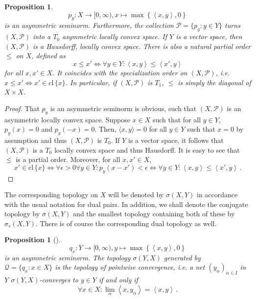 \documentclass[
	paper=A4,
	pagesize=auto,
	fontsize=12pt
]{scrartcl}
\theoremstyle{plain}
\newtheorem{proposition}[theorem]{Proposition}
\theoremstyle{remark}
\theoremstyle{definition}
\begin{document}
\begin{proposition}
\label{prop:WeakTop}
\begin{equation}
p_y : X \to [0, \infty), x \mapsto \max \left\{ \left\langle x, y \right\rangle, 0 \right\}
\end{equation}
%
is an asymmetric seminorm.
Furthermore, the collection $\mathcal{P} = \{ p_y : y \in Y \}$ turns $(X, \mathcal{P})$ into a $T_0$ asymmetric locally convex space.
If $Y$ is a vector space, then $(X, \mathcal{P})$ is a Hausdorff, locally convex space.
There is also a natural partial order $\le$ on $X$, defined as
%
\begin{equation}
x \le x' \iff \forall y \in Y : \left< x, y \right> \le \left< x', y \right>
\end{equation}
%
for all $x, x' \in X$.
It coincides with the specialization order on $(X, \mathcal{P})$, i.e. $x \le x' \iff x' \in \mathrm{cl}\, \{ x \}$.
In particular, if $(X, \mathcal{P})$ is $T_1$, $\le$ is simply the diagonal of $X \times X$.
\end{proposition}
\begin{proof}
That $p_y$ is an asymmetric seminorm is obvious, such that $(X, \mathcal{P})$ is an asymmetric locally convex space.
Suppose $x \in X$ such that for all $y \in Y$, $p_y(x) = 0$ and $p_y(-x) = 0$.
Then, $\langle x, y \rangle = 0$ for all $y \in Y$ such that $x = 0$ by assumption and thus $(X, \mathcal{P})$ is $T_0$.
If $Y$ is a vector space, it follows that $(X, \mathcal{P})$ is a $T_0$ locally convex space and thus Hausdorff.
It is easy to see that $\le$ is a partial order.
Moreover, for all $x, x' \in X$,
%
\begin{equation}
x' \in \mathrm{cl}\, \{ x \}
\iff
\forall \epsilon > 0 \forall y \in Y : p_y \left( x - x' \right) < \epsilon
\iff
\forall y \in Y : \left< x, y \right> \le \left< x', y \right> \, .
\end{equation}
\end{proof}
%
The corresponding topology on $X$ will be denoted by $\sigma(X, Y)$ in accordance with the usual notation for dual pairs.
In addition, we shall denote the conjugate topology by $\overline{\sigma}(X, Y)$ and the smallest topology containing both of these by $\sigma_s(X, Y)$.
There is of course the corresponding dual topology as well.
%
\begin{proposition}[{\cite[Proposition 2.4.1]{src:Cobzaş:FunctionalAnalysisinAsymmetricNormedSpaces}}]
\label{prop:WeakStarTop}
\begin{equation}
q_x : Y \to [0, \infty), y \mapsto \max \left\{ \left\langle x, y \right\rangle, 0 \right\}
\end{equation}
%
is an asymmetric seminorm.
The topology $\sigma(Y, X)$ generated by $\mathcal{Q} = \{ q_x : x \in X \}$ is the topology of pointwise convergence, i.e. a net $(y_\alpha)_{\alpha \in I}$ in $Y$ $\sigma(Y, X)$-converges to $y \in Y$ if and only if
%
\begin{equation}
\forall x \in X : \lim_\alpha \left< x, y_\alpha \right> = \left< x, y \right> \, .
\end{equation}
\end{proposition}
\end{document}
